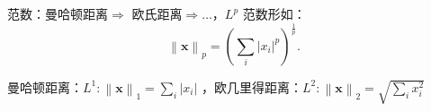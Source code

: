 \begin{defi}
    范数：曼哈顿距离$\Rightarrow $ 欧氏距离$\Rightarrow \ldots $，$L^p$ 范数形如：\[
        \left\lVert \bm{x} \right\rVert_{p} = \left( \sum_{i} \left| x_{i} \right|^p \right)^\frac{1}{p}
    .\]
\end{defi}
\begin{eg}
    曼哈顿距离：$L^1:\left\lVert \bm{x} \right\rVert_{1} = \sum_{i}^{} \left| x_{i} \right|$ ，欧几里得距离：$L^2:\left\lVert \bm{x} \right\rVert_{2} = \sqrt{\sum_{i}^{} x_{i}^2 }$
\end{eg}
